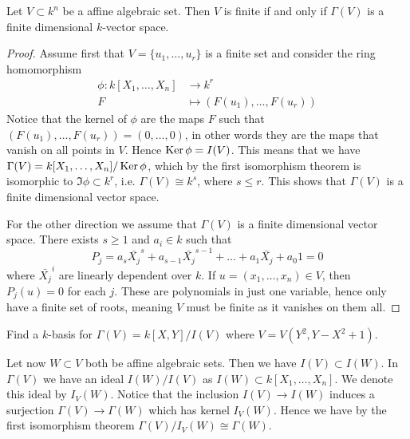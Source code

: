 \begin{proposition}
Let $V\subset k^n$ be a affine algebraic set. Then $V$ is finite if and only if $\Gamma(V)$ is a finite dimensional $k$-vector space. 
\end{proposition}
\label{prop:finite_iff_fin-dim-vs}
\begin{proof}
Assume first that $V=\{u_1, \ldots, u_r \}$ is a finite set and consider the ring homomorphism 
\begin{align*}
    \phi\colon k[X_1, \ldots, X_n] &\longrightarrow k^r \\
    F&\longmapsto (F(u_1), \ldots, F(u_r))
\end{align*}
Notice that the kernel of $\phi$ are the maps $F$ such that $(F(u_1), \ldots, F(u_r)) = (0,\ldots, 0)$, in other words they are the maps that vanish on all points in $V$. Hence $\operatorname{Ker} \phi = I(V)$. This means that we have $\Gamma(V) = k[X_1, \ldots, X_n]/\operatorname{Ker}\phi$, which by the first isomorphism theorem is isomorphic to $\Im\phi \subset k^r$, i.e. $\Gamma(V)\cong k^s$, where $s\leq r$. This shows that $\Gamma(V)$ is a finite dimensional vector space. 

For the other direction we assume that $\Gamma(V)$ is a finite dimensional vector space. There exists $s\geq 1$ and $a_i\in k$ such that
\begin{equation*}
    P_j=a_s \bar{X_j}^s + a_{s-1}\bar{X_j}^{s-1}+\ldots + a_1\bar{X_j}+a_0 1 = 0
\end{equation*}
where $\bar{X_j}^i$ are linearly dependent over $k$. If $u=(x_1, \ldots, x_n) \in V$, then $P_j(u)=0$ for each $j$. These are polynomials in just one variable, hence only have a finite set of roots, meaning $V$ must be finite as it vanishes on them all. 
\end{proof}

\begin{problem}
Find a $k$-basis for $\Gamma(V)=k[X, Y]/I(V)$ where $V=V(Y^2, Y-X^2+1)$. 
\end{problem}
\begin{solution}

\end{solution}

Let now $W\subset V$ both be affine algebraic sets. Then we have $I(V)\subset I(W)$. In $\Gamma(V)$ we have an ideal $I(W)/I(V)$ as $I(W)\subset k[X_1, \ldots, X_n]$. We denote this ideal by $I_V(W)$. Notice that the inclusion $I(V)\rightarrow I(W)$ induces a surjection $\Gamma(V)\rightarrow \Gamma(W)$ which has kernel $I_V(W)$. Hence we have by the first isomorphism theorem $\Gamma(V)/I_V(W) \cong \Gamma(W)$. 

